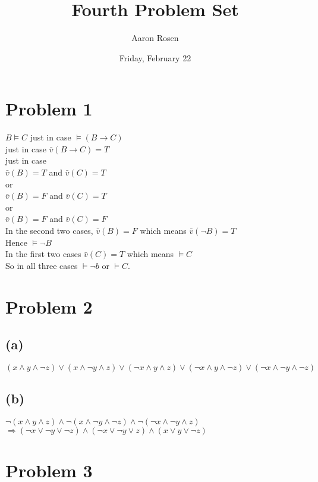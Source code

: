 \documentclass[11pt, a4paper, oneside]{article}
\begin{document}
\title{Fourth Problem Set}
\author{Aaron Rosen}
\date{Friday, February 22}
\maketitle

\section*{Problem 1}
$B \models C$ just in case $\models (B \to C)$ \\
just in case $\bar{v}(B \to C) = T$ \\
just in case \\
$\bar{v}(B) = T$ and $\bar{v}(C) = T$ \\
or \\
$\bar{v}(B) = F$ and $\bar{v}(C) = T$ \\
or \\
$\bar{v}(B) = F$ and $\bar{v}(C) = F$ \\
In the second two cases, $\bar{v}(B) = F$ 
   which means $\bar{v}(\neg{B}) = T$\\ 
Hence $\models \neg{B}$\\
In the first two cases $\bar{v}(C) = T$ which means $\models C$\\
So in all three cases $\models \neg{b}$ or $\models C$.


\section*{Problem 2}
\subsection*{(a)}
$(x \land y \land \neg{z}) \lor (x \land \neg{y} \land z) 
   \lor (\neg{x} \land y \land z) \lor (\neg{x} \land y \land \neg{z})
   \lor (\neg{x} \land \neg{y} \land \neg{z})$

\subsection*{(b)}
$\neg{(x \land y \land z)} \land \neg{(x \land \neg{y} \land \neg{z})}
      \land \neg{(\neg{x} \land \neg{y} \land z)}$\\
$\Rightarrow (\neg{x} \lor \neg{y} \lor \neg{z}) 
      \land (\neg{x} \lor \neg{y} \lor z) \land (x \lor y \lor \neg{z})$

\section*{Problem 3}
\end{document}
